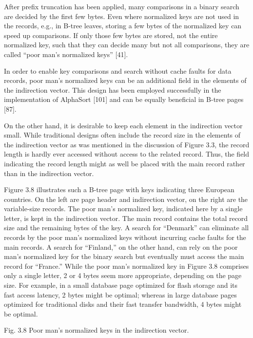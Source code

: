 After prefix truncation has been applied, many comparisons in a binary
search are decided by the first few bytes. Even where normalized keys
are not used in the records, e.g., in B-tree leaves, storing a few bytes
of the normalized key can speed up comparisons. If only those few bytes
are stored, not the entire normalized key, such that they can decide
many but not all comparisons, they are called ``poor man's normalized
keys'' {[}41{]}.

In order to enable key comparisons and search without cache faults for
data records, poor man's normalized keys can be an additional field in
the elements of the indirection vector. This design has been employed
successfully in the implementation of AlphaSort {[}101{]} and can be
equally beneficial in B-tree pages {[}87{]}.

On the other hand, it is desirable to keep each element in the
indirection vector small. While traditional designs often include the
record size in the elements of the indirection vector as was mentioned
in the discussion of Figure 3.3, the record length is hardly ever
accessed without access to the related record. Thus, the field
indicating the record length might as well be placed with the main
record rather than in the indirection vector.

Figure 3.8 illustrates such a B-tree page with keys indicating three
European countries. On the left are page header and indirection vector,
on the right are the variable-size records. The poor man's normalized
key, indicated here by a single letter, is kept in the indirection
vector. The main record contains the total record size and the remaining
bytes of the key. A search for ``Denmark'' can eliminate all records by
the poor man's normalized keys without incurring cache faults for the
main records. A search for ``Finland,'' on the other hand, can rely on
the poor man's normalized key for the binary search but eventually must
access the main record for ``France.'' While the poor man's normalized
key in Figure 3.8 comprises only a single letter, 2 or 4 bytes seem more
appropriate, depending on the page size. For example, in a small
database page optimized for flash storage and its fast access latency, 2
bytes might be optimal; whereas in large database pages optimized for
traditional disks and their fast transfer bandwidth, 4 bytes might be
optimal.

Fig. 3.8 Poor man's normalized keys in the indirection vector.

